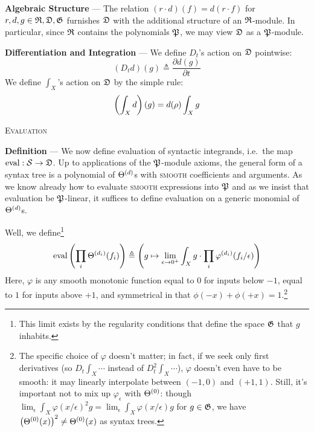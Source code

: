     \textbf{Algebraic Structure} ---
    The relation $(r\cdot d)(f) = d(r\cdot f)$ for $r,d,g \in {\frak
    R},\frak{D},\frak{G}$ furnishes $\frak D$ with the additional structure of
    an $\frak R$-module.  In particular, since $\frak R$ contains the
    polynomials $\frak P$, we may view $\frak{D}$ as a $\frak P$-module. 

    \textbf{Differentiation and Integration} ---
    We define $D_t$'s action on $\frak D$ pointwise:
    $$
        (D_t d)(g) \triangleq \frac{\partial d(g)}{\partial t}
    $$
    We define $\int_X$'s action on $\frak D$ by the simple rule:
    $$
        \left(\int_X d\right)(g) = d(\rho) \int_X g
    $$

\begin{center}\large\textsc{Evaluation}\end{center}

    \textbf{Definition} ---
    We now define evaluation of syntactic integrands, i.e.\ the map
    $\text{eval}:{\mathcal S}\to{\frak D}$.  Up to applications of the $\frak
    P$-module axioms, the general form of a syntax tree is a polynomial of
    $\Theta^{(d)}$s with \textsc{smooth} coefficients and arguments.  As we know
    already how to evaluate \textsc{smooth} expressions into $\frak P$ and as
    we insist that evaluation be $\frak P$-linear, it suffices to define
    evaluation on a generic monomial of $\Theta^{(d)}$s.

    Well, we define\footnote{
        This limit exists by the regularity conditions that define the space $\frak G$ that $g$ inhabits.
    }
    $$
        \text{eval}\left(\prod_i \Theta^{(d_i)}(f_i)\right)
        \triangleq
        \left(
            g \mapsto
            \lim_{\epsilon\to 0^+}
            \int_X g \cdot
            \prod_i \varphi^{(d_i)}(f_i/\epsilon) 
        \right)
    $$
    Here, $\varphi$ is any smooth monotonic function equal to $0$ for inputs
    below $-1$, equal to $1$ for inputs above $+1$, and symmetrical in
    that $\phi(-x)+\phi(+x)=1$.\footnote{
        The specific choice of $\varphi$ doesn't matter; in fact,
        if we seek only first derivatives (so $D_t \int_X \cdots$ instead of
        $D_t^2 \int_X \cdots$), $\varphi$ doesn't even have to be smooth: it
        may linearly interpolate between $(-1,0)$ and $(+1,1)$.
        Still, it's important not to mix up $\varphi_\epsilon$ with
        $\Theta^{(0)}$: though $\lim_\epsilon \int_X \varphi(x/\epsilon)^2 g =
        \lim_\epsilon \int_X \varphi(x/\epsilon) g$ for $g\in \frak G$, we
        have $\left(\Theta^{(0)}(x)\right)^2 \neq \Theta^{(0)}(x)$ as syntax trees.
    }
    
